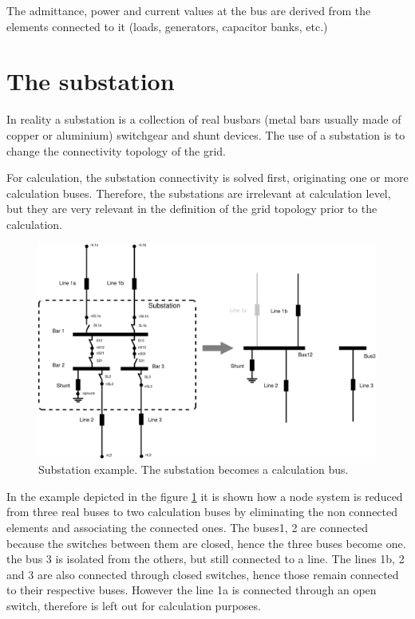 \documentclass[a4paper,twoside,fleqn]{tufte-book}
\begin{document}
The admittance, power and current values at the bus are derived from the elements connected to it (loads, generators, capacitor banks, etc.)


\section{The substation}

In reality a substation is a collection of real busbars (metal bars usually made of copper or aluminium) switchgear and shunt devices. The use of a substation is to change the connectivity topology of the grid.

For calculation, the substation connectivity is solved first, originating one or more calculation buses. Therefore, the substations are irrelevant at calculation level, but they are very relevant in the definition of the grid topology prior to the calculation.

\begin{figure}
	\includegraphics[width=0.99\linewidth]{img/Substation.eps}
	\caption{Substation example. The substation becomes a calculation bus.}
	\label{substation_model}
\end{figure}

In the example depicted in the figure \ref{substation_model} it is shown how a node system is reduced from three real buses to two calculation buses by eliminating the non connected elements and associating the connected ones. The buses1, 2 are connected because the switches between them are closed, hence the three buses become one. the bus 3 is isolated from the others, but still connected to a line. The lines 1b, 2 and 3 are also connected through closed switches, hence those remain connected to their respective buses. However the line 1a is connected through an open switch, therefore is left out for calculation purposes.
\end{document}
